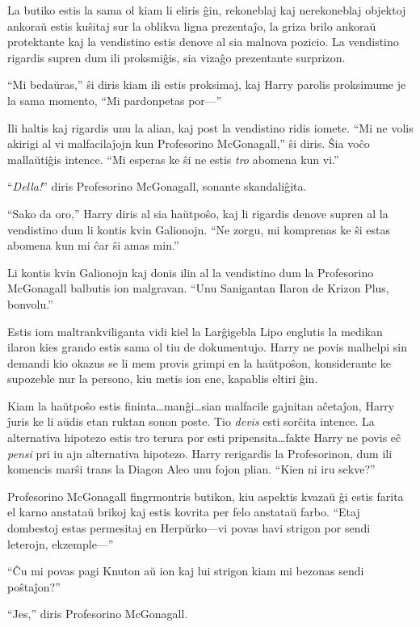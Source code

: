 La butiko estis la sama ol kiam li eliris ĝin, rekoneblaj kaj
nerekoneblaj objektoj ankoraŭ estis kuŝitaj sur la oblikva ligna
prezentaĵo, la griza brilo ankoraŭ protektante kaj la vendistino estis
denove al sia malnova pozicio. La vendistino rigardis supren dum ili
proksmiĝis, sia vizaĝo prezentante surprizon.

``Mi bedaŭras,'' ŝi diris kiam ili estis proksimaj, kaj Harry parolis
proksimume je la sama momento, ``Mi pardonpetas por—''

Ili haltis kaj rigardis unu la alian, kaj post la vendistino ridis
iomete. ``Mi ne volis akirigi al vi malfacilaĵojn kun Profesorino
McGonagall,'' ŝi diris. Ŝia voĉo mallaŭtiĝis intence. ``Mi esperas ke
ŝi ne estis \emph{tro} abomena kun vi.''

``\emph{Della!}'' diris Profesorino McGonagall, sonante skandaliĝita.

``Sako da oro,'' Harry diris al sia haŭtpoŝo, kaj li rigardis denove
supren al la vendistino dum li kontis kvin Galionojn. ``Ne zorgu, mi
komprenas ke ŝi estas abomena kun mi ĉar ŝi amas min.''

Li kontis kvin Galionojn kaj donis ilin al la vendistino dum la
Profesorino McGonagall balbutis ion malgravan. ``Unu Sanigantan
Ilaron de Krizon Plus, bonvolu.''

Estis iom maltrankviliganta vidi kiel la Larĝigebla Lipo englutis la
medikan ilaron kies grando estis sama ol tiu de dokumentujo. Harry ne
povis malhelpi sin demandi kio okazus se li mem provis grimpi en la
haŭtpoŝon, konsiderante ke supozeble nur la persono, kiu metis ion
ene, kapablis eltiri ĝin.

Kiam la haŭtpoŝo estis fininta\ldots manĝi\ldots sian malfacile
gajnitan aĉetaĵon, Harry ĵuris ke li aŭdis etan ruktan sonon poste.
Tio \emph{devis} esti sorĉita intence. La alternativa hipotezo estis
tro terura por esti pripensita\ldots fakte Harry ne povis eĉ
\emph{pensi} pri iu ajn alternativa hipotezo. Harry rerigardis la
Profesorinon, dum ili komencis marŝi trans la Diagon Aleo unu fojon
plian. ``Kien ni iru sekve?''

Profesorino McGonagall fingrmontris butikon, kiu aspektis kvazaŭ ĝi estis
farita el karno anstataŭ brikoj kaj estis kovrita per felo anstataŭ
farbo. ``Etaj dombestoj estas permesitaj en Herpŭrko—vi povas havi
strigon por sendi leterojn, ekzemple—''

``Ĉu mi povas pagi Knuton aŭ ion kaj lui strigon kiam mi bezonas sendi
poŝtaĵon?''

``Jes,'' diris Profesorino McGonagall.

